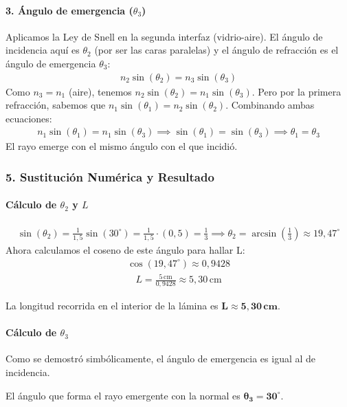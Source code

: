 \paragraph{3. Ángulo de emergencia ($\theta_3$)}
Aplicamos la Ley de Snell en la segunda interfaz (vidrio-aire). El ángulo de incidencia aquí es $\theta_2$ (por ser las caras paralelas) y el ángulo de refracción es el ángulo de emergencia $\theta_3$:
\begin{gather}
    n_2 \sin(\theta_2) = n_3 \sin(\theta_3)
\end{gather}
Como $n_3 = n_1$ (aire), tenemos $n_2 \sin(\theta_2) = n_1 \sin(\theta_3)$. Pero por la primera refracción, sabemos que $n_1 \sin(\theta_1) = n_2 \sin(\theta_2)$. Combinando ambas ecuaciones:
\begin{gather}
    n_1 \sin(\theta_1) = n_1 \sin(\theta_3) \implies \sin(\theta_1) = \sin(\theta_3) \implies \theta_1 = \theta_3
\end{gather}
El rayo emerge con el mismo ángulo con el que incidió.

\subsubsection*{5. Sustitución Numérica y Resultado}
\paragraph{Cálculo de $\theta_2$ y $L$}
\begin{gather}
    \sin(\theta_2) = \frac{1}{1,5} \sin(30^\circ) = \frac{1}{1,5} \cdot (0,5) = \frac{1}{3} \implies \theta_2 = \arcsin\left(\frac{1}{3}\right) \approx 19,47^\circ
\end{gather}
Ahora calculamos el coseno de este ángulo para hallar L:
\begin{gather}
    \cos(19,47^\circ) \approx 0,9428
\end{gather}
\begin{gather}
    L = \frac{5 \, \text{cm}}{0,9428} \approx 5,30 \, \text{cm}
\end{gather}
\begin{cajaresultado}
    La longitud recorrida en el interior de la lámina es $\boldsymbol{L \approx 5,30 \, \textbf{cm}}$.
\end{cajaresultado}

\paragraph{Cálculo de $\theta_3$}
Como se demostró simbólicamente, el ángulo de emergencia es igual al de incidencia.
\begin{cajaresultado}
    El ángulo que forma el rayo emergente con la normal es $\boldsymbol{\theta_3 = 30^\circ}$.
\end{cajaresultado}

